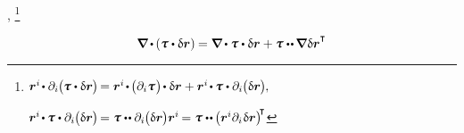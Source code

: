 , \footnote{%
${ \currentlocationvector^{i} \hspace{-0.25ex} \dotp \partial_i \hspace{-0.1ex} \bigl( \hspace{-0.1ex} \cauchystress \dotp \variation{\currentlocationvector} \hspace{-0.1ex} \bigr) \hspace{-0.25ex}
= \currentlocationvector^{i} \hspace{-0.25ex} \dotp \hspace{-0.2ex} \bigl( \partial_i \cauchystress \hspace{.1ex} \bigr) \hspace{-0.25ex} \dotp \variation{\currentlocationvector}
+ \currentlocationvector^{i} \hspace{-0.25ex} \dotp \hspace{-0.1ex} \cauchystress \dotp \partial_i \hspace{-0.1ex} \bigl( \variation{\currentlocationvector} \hspace{-0.1ex} \bigr)
\hspace{-0.1ex} , }$

\hspace*{\fill}
${ \currentlocationvector^{i} \hspace{-0.25ex} \dotp \hspace{-0.1ex} \cauchystress \dotp \partial_i \hspace{-0.1ex} \bigl( \variation{\currentlocationvector} \hspace{-0.1ex} \bigr) \hspace{-0.25ex}
= \cauchystress \dotdotp \partial_i \hspace{-0.1ex} \bigl( \variation{\currentlocationvector} \hspace{-0.1ex} \bigr) \currentlocationvector^{i} \hspace{-0.2ex}
= \cauchystress \dotdotp \hspace{-0.12ex} \bigl( \currentlocationvector^{i} \partial_i \hspace{.12ex} \variation{\currentlocationvector} \bigr)^{\raisemath{-0.1em}{\hspace{-0.4ex}\T}} }$%
}

\nopagebreak\vspace{-0.1em}\begin{equation*}
\boldnabla \hspace{-0.1ex} \dotp \hspace{-0.1ex} \left( \cauchystress \dotp \variation{\currentlocationvector} \right) \hspace{-0.1ex}
= \boldnabla \hspace{-0.1ex} \dotp \cauchystress \dotp \variation{\currentlocationvector}
+ \cauchystress \dotdotp \hspace{-0.12ex} \boldnabla \hspace{.1ex} \variation{\currentlocationvector}^{\T}
\end{equation*}

